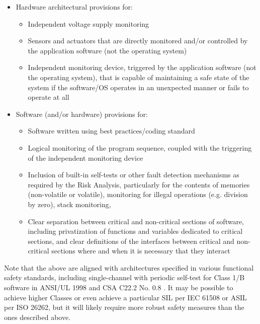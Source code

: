 \documentclass[12pt]{../Common_files/ElisaPaper}
\begin{document}
\begin{itemize}

\item Hardware architectural provisions for:

\begin{itemize}

\item Independent voltage supply monitoring

\item Sensors and actuators that are directly monitored and/or controlled by the application software (not the operating system)

\item Independent monitoring device, triggered by the application software (not the operating system), that is capable of maintaining a safe state of the system if the software/OS operates in an unexpected manner or fails to operate at all

\end{itemize}

\item Software (and/or hardware) provisions for:

\begin{itemize}

\item Software written using best practices/coding standard

\item Logical monitoring of the program sequence, coupled with the triggering of the independent monitoring device

\item Inclusion of built-in self-tests or other fault detection mechanisms as required by the Risk Analysis, particularly for the contents of memories (non-volatile or volatile), monitoring for illegal operations (e.g. division by zero), stack monitoring,

\item Clear separation between critical and non-critical sections of software, including privatization of functions and variables dedicated to critical sections, and clear definitions of the interfaces between critical and non-critical sections where and when it is necessary that they interact

\end{itemize}

\end{itemize}

\bigbreak
Note that the above are aligned with architectures specified in various functional safety standards, including single-channel with periodic self-test for Class 1/B software in ANSI/UL 1998 \cite{UL1998} and CSA C22.2 No. 0.8 \cite{CSA0.8}.  It may be possible to achieve higher Classes or even achieve a particular SIL per IEC 61508 or ASIL per ISO 26262, but it will likely require more robust safety measures than the ones described above.
\end{document}
